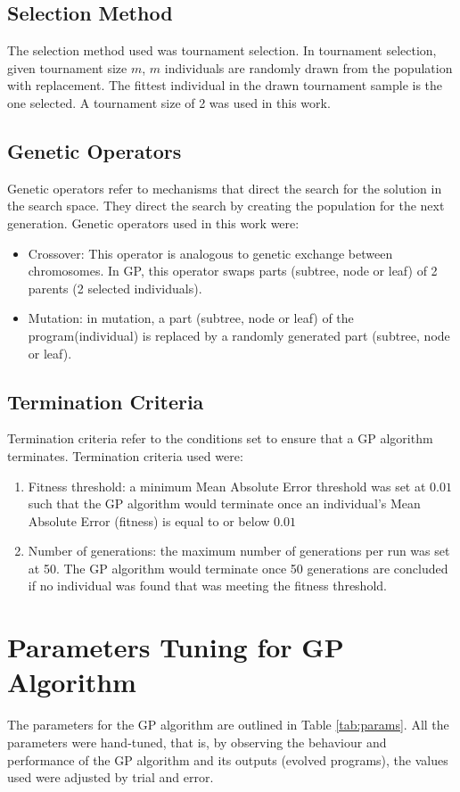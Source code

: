 \documentclass[a4paper,12pt]{article}
\begin{document}
\subsection{Selection Method}
The selection method used was tournament selection. In tournament selection, given tournament size $m$, $m$ individuals are randomly drawn from the population with replacement. The fittest individual in the drawn tournament sample is the one selected. A tournament size of 2 was used in this work.
\subsection{Genetic Operators}
Genetic operators refer to mechanisms that direct the search for the solution in the search space. They direct the search by creating the population for the next generation. Genetic operators used in this work were:
\begin{itemize}
    \item Crossover: This operator is analogous to genetic exchange between chromosomes. In GP, this operator swaps parts (subtree, node or leaf) of 2 parents (2 selected individuals).
    \item Mutation: in mutation, a part (subtree, node or leaf) of the program(individual) is replaced by a randomly generated part (subtree, node or leaf).
\end{itemize}
\subsection{Termination Criteria}
Termination criteria refer to the conditions set to ensure that a GP algorithm terminates. Termination criteria used were:
\begin{enumerate}
    \item Fitness threshold: a minimum Mean Absolute Error threshold was set at $0.01$ such that the GP algorithm would terminate once an individual's Mean Absolute Error (fitness) is equal to or below $0.01$
    \item Number of generations: the maximum number of generations per run was set at 50. The GP algorithm would terminate once 50 generations are concluded if no individual was found that was meeting the fitness threshold.
\end{enumerate}
\section{Parameters Tuning for GP Algorithm}
The parameters for the GP algorithm are outlined in Table \ref{tab:params}. All the parameters were hand-tuned, that is, by observing the behaviour and performance of the GP algorithm and its outputs (evolved programs), the values used were adjusted by trial and error.
\end{document}
